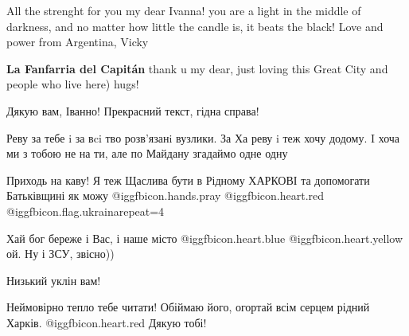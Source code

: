 \begin{itemize}

All the strenght for you my dear Ivanna! you are a light in the middle of
darkness, and no matter how little the candle is, it beats the black! Love and
power from Argentina, Vicky

\textbf{La Fanfarria del Capitán} thank u my dear, just loving this Great City and people who live here) hugs!

Дякую вам, Іванно! Прекрасний текст, гідна справа!


Реву за тебе i за вci тво розв'язанi вузлики. За Ха реву i теж хочу додому. I
хоча ми з тобою не на ти, але по Майдану згадаймо одне одну


Приходь на каву! Я теж Щаслива бути в Рідному ХАРКОВІ та допомогати Батьківщині
як можу  @igg{fbicon.hands.pray}  @igg{fbicon.heart.red} @igg{fbicon.flag.ukraina}{repeat=4}


Хай бог береже і Вас, і наше місто @igg{fbicon.heart.blue}
@igg{fbicon.heart.yellow}  ой. Ну і ЗСУ, звісно))


Низький уклін вам!


Неймовірно тепло тебе читати! Обіймаю його, огортай всім серцем рідний Харків.
@igg{fbicon.heart.red} Дякую тобі!

\end{itemize} %
